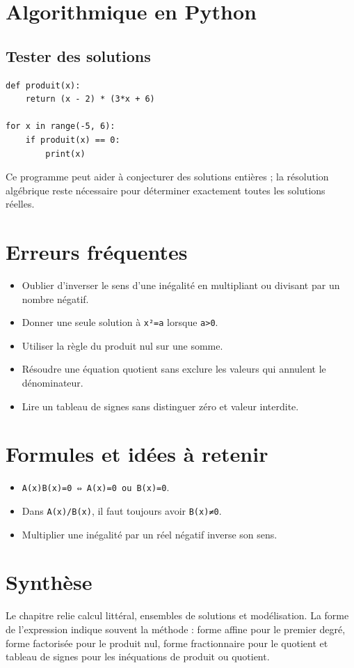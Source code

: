 \section{Algorithmique en Python}

\subsection{Tester des solutions}

\begin{verbatim}
def produit(x):
    return (x - 2) * (3*x + 6)

for x in range(-5, 6):
    if produit(x) == 0:
        print(x)
\end{verbatim}

Ce programme peut aider à conjecturer des solutions entières ; la résolution algébrique reste nécessaire pour déterminer exactement toutes les solutions réelles.

\section{Erreurs fréquentes}

\begin{itemize}
\item Oublier d'inverser le sens d'une inégalité en multipliant ou divisant par un nombre négatif.
\item Donner une seule solution à \texttt{x²=a} lorsque \texttt{a>0}.
\item Utiliser la règle du produit nul sur une somme.
\item Résoudre une équation quotient sans exclure les valeurs qui annulent le dénominateur.
\item Lire un tableau de signes sans distinguer zéro et valeur interdite.
\end{itemize}

\section{Formules et idées à retenir}

\begin{itemize}
\item \texttt{A(x)B(x)=0 ⇔ A(x)=0 ou B(x)=0}.
\item Dans \texttt{A(x)/B(x)}, il faut toujours avoir \texttt{B(x)≠0}.
\item Multiplier une inégalité par un réel négatif inverse son sens.
\end{itemize}

\section{Synthèse}

Le chapitre relie calcul littéral, ensembles de solutions et modélisation. La forme de l'expression indique souvent la méthode : forme affine pour le premier degré, forme factorisée pour le produit nul, forme fractionnaire pour le quotient et tableau de signes pour les inéquations de produit ou quotient.
